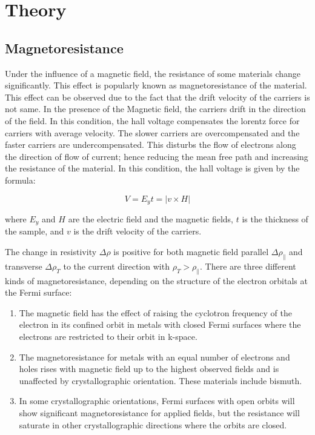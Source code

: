 \section{Theory}
    \subsection{Magnetoresistance}
		Under the influence of a magnetic field, the resistance of some materials change significantly. This effect is popularly known as magnetoresistance of the material. This effect can be observed due to the fact that the drift velocity of the carriers is not same. In the presence of the Magnetic field, the carriers drift in the direction of the field. In this condition, the hall voltage compensates the lorentz force for carriers with average velocity. The slower carriers are overcompensated and the faster carriers are undercompensated. This disturbs the flow of electrons along the direction of flow of current; hence reducing the mean free path and increasing the resistance of the material. In this condition, the hall voltage is given by the formula:
		
		$$V = E_yt = |v\times H|$$

		where $E_y$ and $H$ are the electric field and the magnetic fields, $t$ is the thickness of the sample, and $v$ is the drift velocity of the carriers.

		The change in resistivity $\Delta\rho$ is positive for both magnetic field parallel $\Delta \rho_\parallel$ and transverse $\Delta \rho_T$ to the current direction with $\rho_T>\rho_\parallel$. There are three different kinds of magnetoresistance, depending on the structure of the electron orbitals at the Fermi surface:

		\begin{enumerate}
			\item The magnetic field has the effect of raising the cyclotron frequency of the electron in its confined orbit in metals with closed Fermi surfaces where the electrons are restricted to their orbit in k-space.
			\item The magnetoresistance for metals with an equal number of electrons and holes rises with magnetic field up to the highest observed fields and is unaffected by crystallographic orientation. These materials include bismuth.
			\item In some crystallographic orientations, Fermi surfaces with open orbits will show significant magnetoresistance for applied fields, but the resistance will saturate in other crystallographic directions where the orbits are closed.
		\end{enumerate}

